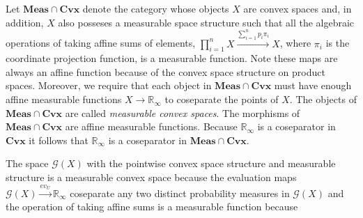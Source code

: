 \documentclass[11pt]{amsart}    %
\newcommand{\G}{\mathcal{G}}
\begin{document}
 Let $\mathbf{Meas} \cap \mathbf{Cvx}$ denote the category whose objects $X$ are convex spaces and, in addition, $X$ also posseses a measurable space structure such that all the algebraic operations of taking  affine sums of elements, \mbox{$\prod_{i=1}^n X \xrightarrow{\sum_{i=1}^n p_i \pi_i} X$}, where $\pi_i$ is the coordinate projection function, is a measurable function.  Note these maps  are always an affine function because of the convex space structure on product spaces.   Moreover, we require that each object in $\mathbf{Meas} \cap \mathbf{Cvx}$ must have enough affine measurable functions $X \rightarrow \mathbb{R}_{\infty}$ to coseparate the points of $X$. The  objects of $\mathbf{Meas} \cap \mathbf{Cvx}$ are called \textit{measurable convex spaces}.  The  morphisms of $\mathbf{Meas} \cap \mathbf{Cvx}$ are affine measurable functions. Because $\mathbb{R}_{\infty}$ is a coseparator in $\mathbf{Cvx}$ it follows that $\mathbb{R}_{\infty}$ is a coseparator in $\mathbf{Meas} \cap \mathbf{Cvx}$. 

The space $\G(X)$ with the pointwise convex space structure and measurable structure is a measurable convex space because
 the evaluation maps $\G(X) \xrightarrow{ev_U} \mathbb{R}_{\infty}$ coseparate any  two distinct probability measures in $\G(X)$ and the operation of taking affine sums is a measurable function because
\end{document}
